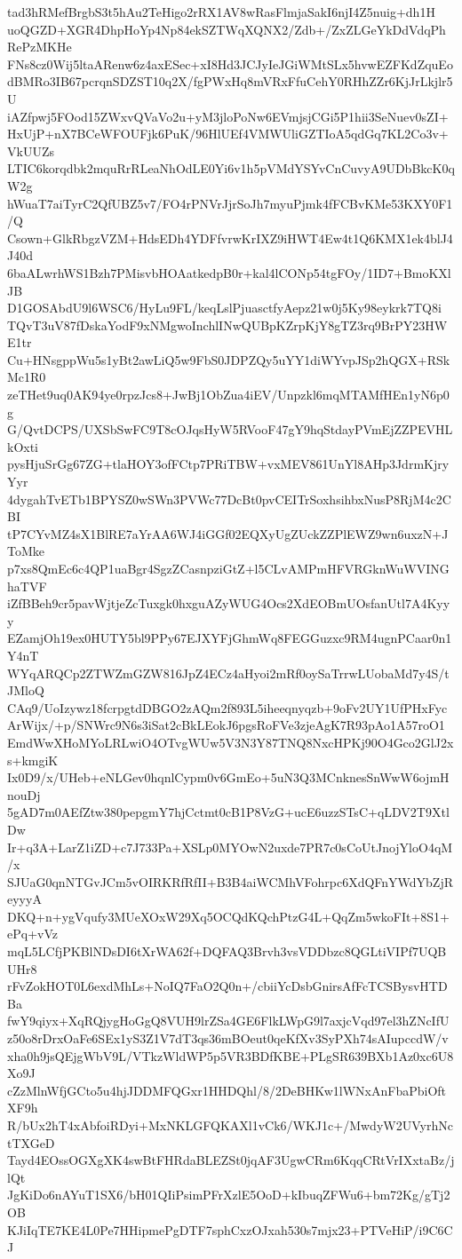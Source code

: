 tad3hRMefBrgbS3t5hAu2TeHigo2rRX1AV8wRasFlmjaSakI6njI4Z5nuig+dh1H
uoQGZD+XGR4DhpHoYp4Np84ekSZTWqXQNX2/Zdb+/ZxZLGeYkDdVdqPhRePzMKHe
FNs8cz0Wij5ltaARenw6z4axESec+xI8Hd3JCJyIeJGiWMtSLx5hvwEZFKdZquEo
dBMRo3IB67pcrqnSDZST10q2X/fgPWxHq8mVRxFfuCehY0RHhZZr6KjJrLkjlr5U
iAZfpwj5FOod15ZWxvQVaVo2u+yM3jloPoNw6EVmjsjCGi5P1hii3SeNuev0sZI+
HxUjP+nX7BCeWFOUFjk6PuK/96HlUEf4VMWUliGZTIoA5qdGq7KL2Co3v+VkUUZs
LTIC6korqdbk2mquRrRLeaNhOdLE0Yi6v1h5pVMdYSYvCnCuvyA9UDbBkcK0qW2g
hWuaT7aiTyrC2QfUBZ5v7/FO4rPNVrJjrSoJh7myuPjmk4fFCBvKMe53KXY0F1/Q
Csown+GlkRbgzVZM+HdsEDh4YDFfvrwKrIXZ9iHWT4Ew4t1Q6KMX1ek4blJ4J40d
6baALwrhWS1Bzh7PMisvbHOAatkedpB0r+kal4lCONp54tgFOy/1ID7+BmoKXlJB
D1GOSAbdU9l6WSC6/HyLu9FL/keqLslPjuasctfyAepz21w0j5Ky98eykrk7TQ8i
TQvT3uV87fDskaYodF9xNMgwoInchlINwQUBpKZrpKjY8gTZ3rq9BrPY23HWE1tr
Cu+HNsgppWu5s1yBt2awLiQ5w9FbS0JDPZQy5uYY1diWYvpJSp2hQGX+RSkMc1R0
zeTHet9uq0AK94ye0rpzJcs8+JwBj1ObZua4iEV/Unpzkl6mqMTAMfHEn1yN6p0g
G/QvtDCPS/UXSbSwFC9T8cOJqsHyW5RVooF47gY9hqStdayPVmEjZZPEVHLkOxti
pysHjuSrGg67ZG+tlaHOY3ofFCtp7PRiTBW+vxMEV861UnYl8AHp3JdrmKjryYyr
4dygahTvETb1BPYSZ0wSWn3PVWc77DcBt0pvCEITrSoxhsihbxNusP8RjM4c2CBI
tP7CYvMZ4sX1BlRE7aYrAA6WJ4iGGf02EQXyUgZUckZZPlEWZ9wn6uxzN+JToMke
p7xs8QmEc6c4QP1uaBgr4SgzZCasnpziGtZ+l5CLvAMPmHFVRGknWuWVINGhaTVF
iZfBBeh9cr5pavWjtjeZcTuxgk0hxguAZyWUG4Ocs2XdEOBmUOsfanUtl7A4Kyyy
EZamjOh19ex0HUTY5bl9PPy67EJXYFjGhmWq8FEGGuzxc9RM4ugnPCaar0n1Y4nT
WYqARQCp2ZTWZmGZW816JpZ4ECz4aHyoi2mRf0oySaTrrwLUobaMd7y4S/tJMloQ
CAq9/UoIzywz18fcrpgtdDBGO2zAQm2f893L5iheeqnyqzb+9oFv2UY1UfPHxFyc
ArWijx/+p/SNWrc9N6s3iSat2cBkLEokJ6pgsRoFVe3zjeAgK7R93pAo1A57roO1
EmdWwXHoMYoLRLwiO4OTvgWUw5V3N3Y87TNQ8NxcHPKj90O4Gco2GlJ2xs+kmgiK
Ix0D9/x/UHeb+eNLGev0hqnlCypm0v6GmEo+5uN3Q3MCnknesSnWwW6ojmHnouDj
5gAD7m0AEfZtw380pepgmY7hjCctmt0cB1P8VzG+ucE6uzzSTsC+qLDV2T9XtlDw
Ir+q3A+LarZ1iZD+c7J733Pa+XSLp0MYOwN2uxde7PR7c0sCoUtJnojYloO4qM/x
SJUaG0qnNTGvJCm5vOIRKRfRfII+B3B4aiWCMhVFohrpc6XdQFnYWdYbZjReyyyA
DKQ+n+ygVqufy3MUeXOxW29Xq5OCQdKQchPtzG4L+QqZm5wkoFIt+8S1+ePq+vVz
mqL5LCfjPKBlNDsDI6tXrWA62f+DQFAQ3Brvh3vsVDDbzc8QGLtiVIPf7UQBUHr8
rFvZokHOT0L6exdMhLs+NoIQ7FaO2Q0n+/cbiiYcDsbGnirsAfFcTCSBysvHTDBa
fwY9qiyx+XqRQjygHoGgQ8VUH9lrZSa4GE6FlkLWpG9l7axjcVqd97el3hZNcIfU
z50o8rDrxOaFe6SEx1yS3Z1V7dT3qs36mBOeut0qeKfXv3SyPXh74sAIupccdW/v
xha0h9jsQEjgWbV9L/VTkzWldWP5p5VR3BDfKBE+PLgSR639BXb1Az0xc6U8Xo9J
cZzMlnWfjGCto5u4hjJDDMFQGxr1HHDQhl/8/2DeBHKw1lWNxAnFbaPbiOftXF9h
R/bUx2hT4xAbfoiRDyi+MxNKLGFQKAXl1vCk6/WKJ1c+/MwdyW2UVyrhNctTXGeD
Tayd4EOssOGXgXK4swBtFHRdaBLEZSt0jqAF3UgwCRm6KqqCRtVrIXxtaBz/jlQt
JgKiDo6nAYuT1SX6/bH01QIiPsimPFrXzlE5OoD+kIbuqZFWu6+bm72Kg/gTj2OB
KJiIqTE7KE4L0Pe7HHipmePgDTF7sphCxzOJxah530s7mjx23+PTVeHiP/i9C6CJ
